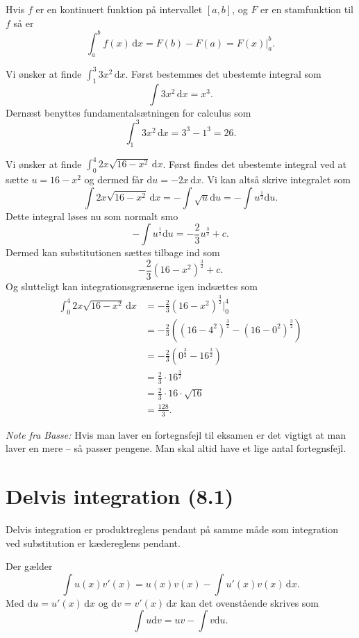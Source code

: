 \begin{sæt} 
  Hvis $f$ er en kontinuert funktion på intervallet $[a,b]$, og $F$ er en stamfunktion til $f$ så er
  \[ 
  \int_{a}^{b} f(x) \, \mathrm{d}x = F(b) - F(a) = F(x) \bigg|_a^{b}
  .\]
\end{sæt}

\begin{eks} 
  Vi ønsker at finde $\int_{1}^{3} 3x^2 \, \mathrm{d}x$.
  \bigbreak
  Først bestemmes det ubestemte integral som
  \[ 
  \int 3x^2 \, \mathrm{d}x = x^3
  .\]
  Dernæst benyttes fundamentalsætningen for calculus som
  \[ 
  \int_{1}^{3} 3x^2 \, \mathrm{d}x = 3^3 - 1^3 = 26
  .\]
\end{eks}

\begin{eks} 
  Vi ønsker at finde $\int_{0}^{4} 2x \sqrt{16 - x^2}\, \mathrm{d}x $.
  \bigbreak
  Først findes det ubestemte integral ved at sætte $u = 16 - x^2$ og dermed får $\mathrm{d}u = -2x \, \mathrm{d}x$. Vi kan altså skrive integralet som
  \[ 
  \int 2x \sqrt{16-x^2} \, \mathrm{d}x = -\int \sqrt{u} \mathrm{d}u = -\int u^{\frac{1}{2}} \mathrm{d}u
  .\]
  Dette integral løses nu som normalt smo
  \[ 
  -\int u^{\frac{1}{2}} \mathrm{d}u = -\frac{2}{3} u^{\frac{3}{2}} + c
  .\]
  Dermed kan substitutionen sættes tilbage ind som
  \[ 
  -\frac{2}{3} \left( 16-x^2 \right)^{\frac{3}{2}} + c
  .\]
  Og slutteligt kan integrationsgrænserne igen indsættes som
  \begin{align*}
  \int_{0}^{4} 2x \sqrt{16-x^2} \, \mathrm{d}x &= -\frac{2}{3} \left( 16-x^2 \right)^{\frac{3}{2}} \bigg|_0^{4} \\
  &= -\frac{2}{3} \left( \left( 16-4^2 \right)^{\frac{3}{2}} - \left( 16-0^2 \right)^{\frac{3}{2}} \right) \\
  &= -\frac{2}{3}\left( 0^{\frac{3}{2}} - 16^{\frac{3}{2}} \right) \\
  &= \frac{2}{3} \cdot 16^{\frac{3}{2}} \\
  &= \frac{2}{3} \cdot 16 \cdot \sqrt{16} \\
  &= \frac{128}{3}
  .\end{align*}
\end{eks}
\textit{Note fra Basse:} Hvis man laver en fortegnsfejl til eksamen er det vigtigt at man laver en mere -- så passer pengene. Man skal altid have et lige antal fortegnsfejl.

\section{Delvis integration (8.1)}
Delvis integration er produktreglens pendant på samme måde som integration ved substitution er kædereglens pendant.
\begin{sæt} 
  Der gælder
  \[
    \int u(x)v'(x) = u(x)v(x) - \int u'(x)v(x) \, \mathrm{d}x
  .\]
  Med $\mathrm{d}u = u'(x) \, \mathrm{d}x$ og $\mathrm{d}v = v'(x) \, \mathrm{d}x$ kan det ovenstående skrives som
  \[ 
  \int u \mathrm{d}v = uv - \int v \mathrm{d}u
  .\]
\end{sæt}

